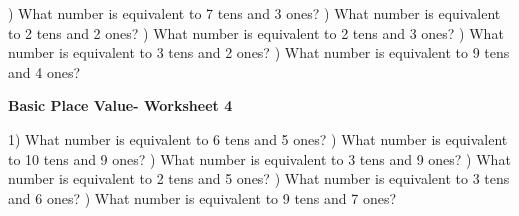 \documentclass{article}%
\begin{document}
\newline%
\newline%
) What number is equivalent to 7 tens and 3 ones?%
\newline%
\newline%
) What number is equivalent to 2 tens and 2 ones?%
\newline%
\newline%
) What number is equivalent to 2 tens and 3 ones?%
\newline%
\newline%
) What number is equivalent to 3 tens and 2 ones?%
\newline%
\newline%
) What number is equivalent to 9 tens and 4 ones?%
\newline%
\newline%
\newline%
\pagebreak%
\large%
\begin{center}%
\textbf{Basic Place Value- Worksheet 4}%
\newline%
\newline%
\newline%
\end{center} \normalsize%
1) What number is equivalent to 6 tens and 5 ones?%
\newline%
\newline%
) What number is equivalent to 10 tens and 9 ones?%
\newline%
\newline%
) What number is equivalent to 3 tens and 9 ones?%
\newline%
\newline%
) What number is equivalent to 2 tens and 5 ones?%
\newline%
\newline%
) What number is equivalent to 3 tens and 6 ones?%
\newline%
\newline%
) What number is equivalent to 9 tens and 7 ones?%
\newline%
\end{document}
